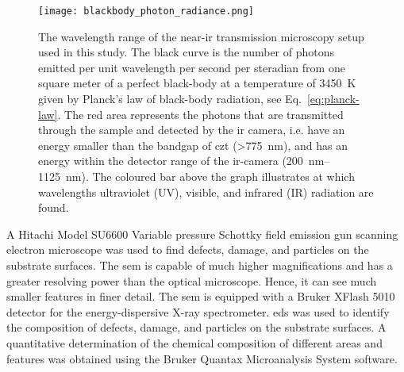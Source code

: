 \begin{figure}[htbp]
    \centering
    \texttt{[image: blackbody\_photon\_radiance.png]}
    \caption[Graph showing the wavelength range of the near-\ac{ir} transmission microscopy setup.]{The wavelength range of the near-\ac{ir} transmission microscopy setup used in this study. The black curve is the number of photons emitted per unit wavelength per second per steradian from one square meter of a perfect black-body at a temperature of \SI{3450}{\kelvin} given by Planck's law of black-body radiation, see Eq.~\eqref{eq:planck-law}. The red area represents the photons that are transmitted through the sample and detected by the \ac{ir} camera, i.e. have an energy smaller than the bandgap of \ac{czt} (\SI{>775}{\nano\metre}),  and has an energy within the detector range of the \ac{ir}-camera (\SIrange{200}{1125}{\nano\metre}). The coloured bar above the graph illustrates at which wavelengths ultraviolet (UV), visible, and infrared (IR) radiation are found.}
    \label{fig:ir-range}
\end{figure}

A Hitachi Model SU6600 Variable pressure Schottky field emission gun scanning electron microscope was used to find defects, damage, and particles on the substrate surfaces. The \ac{sem} is capable of much higher magnifications and has a greater resolving power than the optical microscope. Hence, it can see much smaller features in finer detail. The \ac{sem} is equipped with a Bruker XFlash 5010 detector for the energy-dispersive X-ray spectrometer. \Ac{eds} was used to identify the composition of defects, damage, and particles on the substrate surfaces. A quantitative determination of the chemical composition of different areas and features was obtained using the Bruker Quantax Microanalysis System software.

